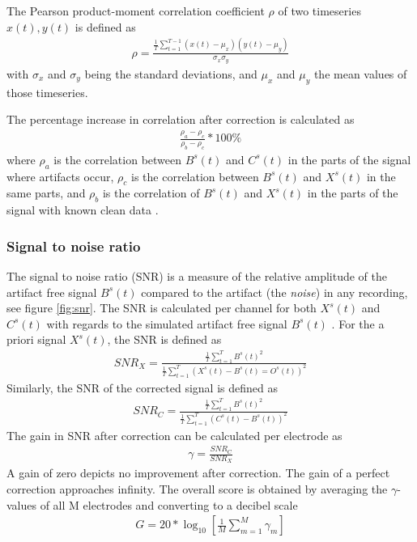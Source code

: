 \documentclass[twoside]{article}
\begin{document}
The Pearson product-moment correlation coefficient $\rho$ of two timeseries $x(t),y(t)$ is defined as \begin{align} \rho = \frac{\frac{1}{T} \sum\limits_{t=1}^{T-1} (x(t) - \mu_x)(y(t) - \mu_y) }{\sigma_x \sigma_y}\end{align} with $\sigma_x$ and $\sigma_y$ being the standard deviations, and $\mu_x$ and $\mu_y$ the mean values of those timeseries.

The percentage increase in correlation after correction is calculated as \begin{align} \frac{\rho_a - \rho_c}{\rho_b - \rho_c} * 100\%\end{align} where $\rho_a$ is the correlation between $B^s(t)$ and $C^s(t)$ in the parts of the signal where artifacts occur, $\rho_c$ is the correlation between $B^s(t)$ and $X^s(t)$ in the same parts, and $\rho_b$ is the correlation of $B^s(t)$ and $X^s(t)$ in the parts of the signal with known clean data \cite{eval}.

\subsubsection{Signal to noise ratio}
The signal to noise ratio (SNR) is a measure of the relative amplitude of the artifact free signal $B^s(t)$ compared to the artifact  (the \textit{noise}) in any recording, see figure \ref{fig:snr}. The SNR is calculated per channel for both $X^s(t)$ and $C^s(t)$ with regards to the simulated artifact free signal $B^s(t)$  \cite{SNR}. For the a priori signal $X^s(t)$, the SNR is defined as \begin{align} SNR_X = \frac{\frac{1}{T} \sum^T_{t=1} B^s(t)^2 }{\frac{1}{T} \sum^T_{t=1} (X^s(t) - B^s(t) = O^s(t))^2} \end{align} Similarly, the SNR of the corrected signal is defined as \begin{align} SNR_C = \frac{\frac{1}{T} \sum^T_{t=1} B^s(t)^2 }{\frac{1}{T} \sum^T_{t=1} (C^s(t) - B^s(t))^2} \end{align}
The gain in SNR after correction can be calculated per electrode as \begin{align}\gamma = \frac{SNR_C}{SNR_X} \end{align} A gain of zero depicts no improvement after correction. The gain of a perfect correction approaches infinity. 
The overall score is obtained by averaging the $\gamma$-values of all M electrodes and converting to a decibel scale \begin{align}G = 20* \log_{10} \left [ \frac{1}{M} \sum^M_{m=1} \gamma_m \right ] \end{align}
\end{document}
